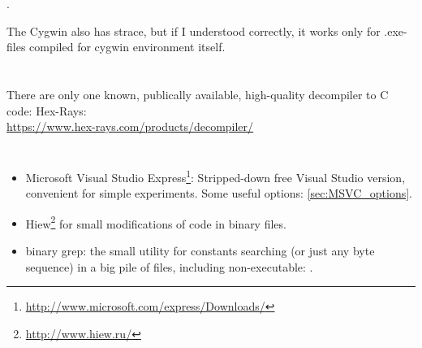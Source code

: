 .

{The Cygwin also has strace, but if I understood correctly, it works only for .exe-files
compiled for cygwin environment itself}.

\chapter{}

{There are only one known, publically available, high-quality decompiler to C code}: Hex-Rays:\\
\url{https://www.hex-rays.com/products/decompiler/}


\chapter{}

\begin{itemize}
\item
Microsoft Visual Studio Express\footnote{\url{http://www.microsoft.com/express/Downloads/}}:
{Stripped-down free Visual Studio version, convenient for simple experiments}.
Some useful options: \ref{sec:MSVC_options}.

\item
\label{Hiew}
Hiew\footnote{\url{http://www.hiew.ru/}} 
{for small modifications of code in binary files}.

\item
{}
binary grep: 
{the small utility for constants searching (or just any byte sequence) in a big pile of files, 
including non-executable: \BGREPURL.}
\end{itemize}

